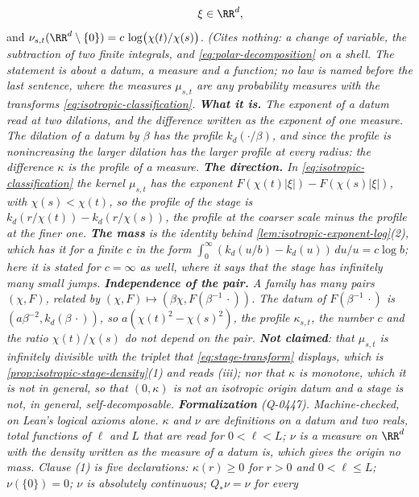 \begin{lemma}
\begin{equation}
  \qquad \xi \in \RR^d ,
\end{equation}
and $\nu_{s,t}(\RR^d \setminus \{0\}) = c\,\log\bigl(\chi(t)/\chi(s)\bigr)$.
\statusT\quad\emph{(Cites nothing: a change of variable, the subtraction of two finite
integrals, and \ref{eq:polar-decomposition} on a shell. The statement is about a datum, a measure
and a function; no law is named before the last sentence, where the measures $\mu_{s,t}$ are any
probability measures with the transforms \ref{eq:isotropic-classification}. \textbf{What it is.}
The exponent of a datum read at two dilations, and the difference written as the exponent of one
measure. The dilation of a datum by $\beta$ has the profile $k_d(\cdot/\beta)$, and since the
profile is nonincreasing the larger dilation has the larger profile at every radius: the
difference $\kappa$ is the profile of a measure. \textbf{The direction.} In
\ref{eq:isotropic-classification} the kernel $\mu_{s,t}$ has the exponent
$F(\chi(t)|\xi|) - F(\chi(s)|\xi|)$, with $\chi(s) < \chi(t)$, so the profile of the stage is
$k_d(r/\chi(t)) - k_d(r/\chi(s))$, the profile at the coarser scale minus the profile at the
finer one. \textbf{The mass} is the identity behind \ref{lem:isotropic-exponent-log}(2), which
has it for a finite $c$ in the form $\int_0^\infty(k_d(u/b) - k_d(u))\,du/u = c\log b$; here it
is stated for $c = \infty$ as well, where it says that the stage has infinitely many small
jumps. \textbf{Independence of the pair.} A family has many pairs $(\chi, F)$, related by
$(\chi, F) \mapsto (\beta\chi, F(\beta^{-1}\,\cdot))$. The datum of $F(\beta^{-1}\,\cdot)$ is
$(a\beta^{-2}, k_d(\beta\,\cdot))$, so $a(\chi(t)^2 - \chi(s)^2)$, the profile $\kappa_{s,t}$,
the number $c$ and the ratio $\chi(t)/\chi(s)$ do not depend on the pair. \textbf{Not claimed}:
that $\mu_{s,t}$ is infinitely divisible with the triplet that \ref{eq:stage-transform}
displays, which is \ref{prop:isotropic-stage-density}(1) and reads (iii); nor that
$\kappa$ is monotone, which it is not in general, so that $(0,\kappa)$ is not an isotropic origin
datum and a stage is not, in general, self-decomposable. \textbf{Formalization} (Q-0447).
Machine-checked, on Lean's logical axioms alone. $\kappa$ and $\nu$ are definitions on a datum and
two reals, total functions of $\ell$ and $L$ that are read for $0 < \ell < L$; $\nu$ is a measure
on $\RR^d$ with the density written as the \Levy{} measure of a datum is, which gives the origin
no mass. Clause (1) is five declarations: $\kappa(r) \ge 0$ for $r > 0$ and
$0 < \ell \le L$; $\nu(\{0\}) = 0$; $\nu$ is absolutely continuous; $Q_*\nu = \nu$ for every
}
\end{lemma}
